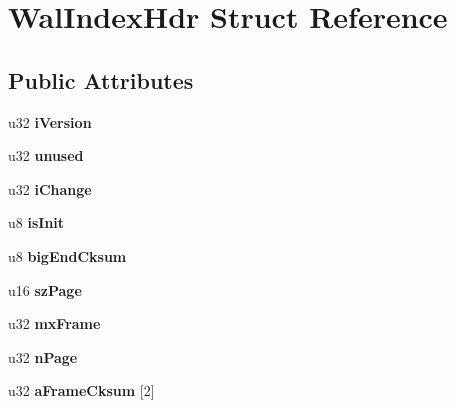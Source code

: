 \hypertarget{struct_wal_index_hdr}{\section{Wal\+Index\+Hdr Struct Reference}
\label{struct_wal_index_hdr}
}
\subsection*{Public Attributes}
\begin{DoxyCompactItemize}
\item 
\hypertarget{struct_wal_index_hdr_a49295f5eb9d6f37a1498cf1a66410b92}{u32 {\bfseries i\+Version}}\label{struct_wal_index_hdr_a49295f5eb9d6f37a1498cf1a66410b92}

\item 
\hypertarget{struct_wal_index_hdr_aa00596b4ad38dce7f97261a49ce64d74}{u32 {\bfseries unused}}\label{struct_wal_index_hdr_aa00596b4ad38dce7f97261a49ce64d74}

\item 
\hypertarget{struct_wal_index_hdr_a9fafc4d4af9ab741b3b8733380a7927f}{u32 {\bfseries i\+Change}}\label{struct_wal_index_hdr_a9fafc4d4af9ab741b3b8733380a7927f}

\item 
\hypertarget{struct_wal_index_hdr_a1cc0dc2be6cd108a7bcca260be3e4cb9}{u8 {\bfseries is\+Init}}\label{struct_wal_index_hdr_a1cc0dc2be6cd108a7bcca260be3e4cb9}

\item 
\hypertarget{struct_wal_index_hdr_aa6be53a6a60ea0b2a97a245b5ca68d61}{u8 {\bfseries big\+End\+Cksum}}\label{struct_wal_index_hdr_aa6be53a6a60ea0b2a97a245b5ca68d61}

\item 
\hypertarget{struct_wal_index_hdr_a74e9182803402942cf6e45d8e23589c7}{u16 {\bfseries sz\+Page}}\label{struct_wal_index_hdr_a74e9182803402942cf6e45d8e23589c7}

\item 
\hypertarget{struct_wal_index_hdr_aa697dbe8134daf3d02dce07feb897f41}{u32 {\bfseries mx\+Frame}}\label{struct_wal_index_hdr_aa697dbe8134daf3d02dce07feb897f41}

\item 
\hypertarget{struct_wal_index_hdr_ae4ca33947cd629feb9dce2b1f976c364}{u32 {\bfseries n\+Page}}\label{struct_wal_index_hdr_ae4ca33947cd629feb9dce2b1f976c364}

\item 
\hypertarget{struct_wal_index_hdr_a425dff294e0f0b30b6819c273404c721}{u32 {\bfseries a\+Frame\+Cksum} \mbox{[}2\mbox{]}}\label{struct_wal_index_hdr_a425dff294e0f0b30b6819c273404c721}


\end{DoxyCompactItemize}
